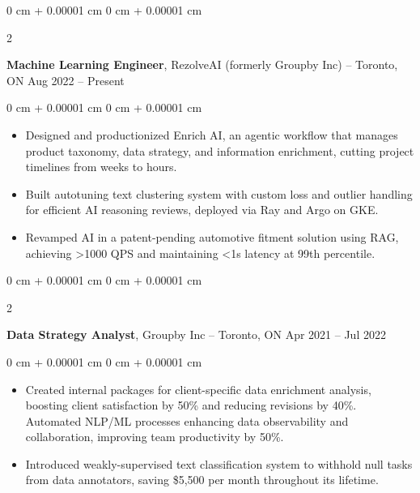 \documentclass[10pt, letterpaper]{article}
\newenvironment{highlights}{
    \begin{itemize}[
        topsep=0.10 cm,
        parsep=0.10 cm,
        partopsep=0pt,
        itemsep=0pt,
        leftmargin=0 cm + 10pt
    ]
}{
    \end{itemize}
} %
\newenvironment{onecolentry}{
    \begin{adjustwidth}{
        0 cm + 0.00001 cm
    }{
        0 cm + 0.00001 cm
    }
}{
    \end{adjustwidth}
} %
\newenvironment{twocolentry}[2][]{
    \onecolentry
    \def\secondColumn{#2}
    \setcolumnwidth{\fill, 4.5 cm}
    \begin{paracol}{2}
}{
    \switchcolumn \raggedleft \secondColumn
    \end{paracol}
    \endonecolentry
} %
\begin{document}
    \begin{twocolentry}{
        Aug 2022 – Present
    }
        \textbf{Machine Learning Engineer}, RezolveAI (formerly Groupby Inc) -- Toronto, ON\end{twocolentry}

    \vspace{0.10 cm}
    \begin{onecolentry}
        \begin{highlights}
            \item Designed and productionized Enrich AI, an agentic workflow that manages product taxonomy, data strategy, and information enrichment, cutting project timelines from weeks to hours.
            \item Built autotuning text clustering system with custom loss and outlier handling for efficient AI reasoning reviews, deployed via Ray and Argo on GKE.
            \item Revamped AI in a patent-pending automotive fitment solution using RAG, achieving >1000 QPS and maintaining <1s latency at 99th percentile.
        \end{highlights}
    \end{onecolentry}

    \vspace{0.2 cm}

    \begin{twocolentry}{
        Apr 2021 – Jul 2022
    }
        \textbf{Data Strategy Analyst}, Groupby Inc -- Toronto, ON\end{twocolentry}

    \vspace{0.10 cm}
    \begin{onecolentry}
        \begin{highlights}
            \item Created internal packages for client-specific data enrichment analysis, boosting client satisfaction by 50\% and reducing revisions by 40\%. Automated NLP/ML processes enhancing data observability and collaboration, improving team productivity by 50\%.
            \item Introduced weakly-supervised text classification system to withhold null tasks from data annotators, saving \$5,500 per month throughout its lifetime.
        \end{highlights}
    \end{onecolentry}

    \vspace{0.2 cm}
\end{document}
